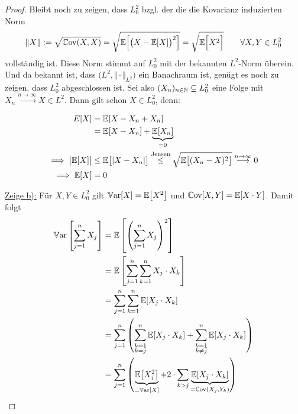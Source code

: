 \begin{proof}
	Bleibt noch zu zeigen, dass $L_0^2$ bzgl. der die die Kovarianz induzierten Norm
	\begin{align*}
		\Vert X\Vert:=\sqrt{\mathbb{C}\text{ov}(X,X)}
		=\sqrt{\mathbb{E}\Big[\big(X-\mathbb{E}[X]\big)^2\Big]}
		=\sqrt{\mathbb{E}\Big[X^2\Big]}
		\qquad\forall X,Y\in L_0^2
	\end{align*}
	vollständig ist. 
	Diese Norm stimmt auf $L_0^2$ mit der bekannten $L^2$-Norm überein. 
	Und da bekannt ist, dass $\big(L^2,\Vert\cdot\Vert_{L^2}\big)$ ein Banachraum ist, genügt es noch zu zeigen, dass $L_0^2$ abgeschlossen ist.
	Sei also $(X_n)_{n\in\mathbb{N}}\subseteq L_0^2$ eine Folge mit
	$X_n\stackrel{n\to\infty}{\longrightarrow}X\in L^2$.
	Dann gilt schon $X\in L_0^2$, denn:


	\begin{align*}
		E[X]
		&=\mathbb{E}[X-X_n+X_n]\\ 
		&=\mathbb{E}[X-X_n]+\underbrace{\mathbb{E}[X_n]}_{=0}\\
		\implies
		\big|\mathbb{E}[X]\big|&\leq \mathbb{E}\big[|X-X_n|\big]
		\overset{\text{Jensen}}{\leq}
		\sqrt{\mathbb{E}\big[(X_n-X)^2\big]}
		\overset{n\to\infty}{\longrightarrow} 0\\
		\implies
		\mathbb{E}[X]&=0
	\end{align*}

	\underline{Zeige b):} 
	Für $X,Y\in L_0^2$ gilt $\mathbb{V}\text{ar}[X]=\mathbb{E}\big[X^2\big]$ und $\mathbb{C}\text{ov}[X,Y]=\mathbb{E}[X\cdot Y]$. 
	Damit folgt
	\begin{align*}
		\mathbb{V}\text{ar}\left[\sum\limits_{j=1}^n X_j\right]
		&=\mathbb{E}\left[\left(\sum\limits_{j=1}^n X_j\right)^2\right]\\
		&=\mathbb{E}\left[\sum\limits_{j=1}^n\sum\limits_{k=1}^n X_j\cdot X_k\right]\\
		&=\sum\limits_{j=1}^n\sum\limits_{k=1}^n \mathbb{E}[X_j\cdot X_k]\\
		&=\sum\limits_{j=1}^n\left(
		\sum\limits_{\begin{subarray}{c}k=1\\ k=j\end{subarray}}^n \mathbb{E}[X_j\cdot X_k]
		+\sum\limits_{\begin{subarray}{c}k=1\\ k\neq j\end{subarray}}^n \mathbb{E}[X_j\cdot X_k]\right)\\
		&=\sum\limits_{j=1}^n\left(\underbrace{\mathbb{E}\big[X_j^2\big]}_{=\mathbb{V}\text{ar}[X]}+2\cdot\sum\limits_{k>j}\underbrace{\mathbb{E}[X_j\cdot X_k]}_{=\mathbb{C}\text{ov}(X_j,Y_k)}\right)
	\end{align*}


\end{proof}
